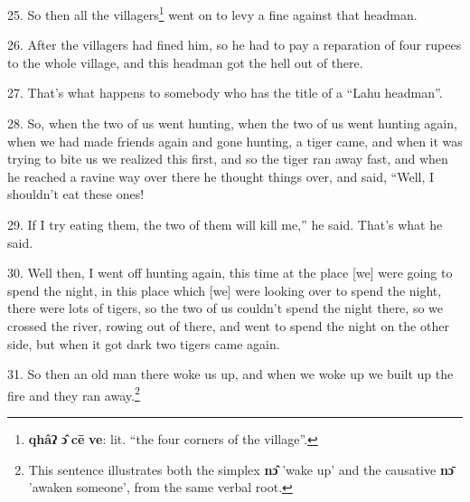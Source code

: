 25. So then all the villagers\footnote{\textbf{qhâʔ} \textbf{ɔ̂} \textbf{cē} \textbf{ve}: lit. ``the four corners of the village''.} went on to levy a fine against that headman.

26. After the villagers had fined him, so he had to pay a reparation of four rupees
to the whole village, and this headman got the hell out of there.

27. That's what happens to somebody who has the title of a ``Lahu headman''.

28. So, when the two of us went hunting, when the two of us went hunting again,
when we had made friends again and gone hunting, a tiger came, and when it was
trying to bite us we realized this first, and so the tiger ran away fast, and when
he reached a ravine way over there he thought things over, and said, ``Well, I
shouldn't eat these ones!

29. If I try eating them, the two of them will kill me,'' he said. That's what he
said.

30. Well then, I went off hunting again, this time at the place [we] were going
to spend the night, in this place which [we] were looking over to spend the night,
there were lots of tigers, so the two of us couldn't spend the night there, so
we crossed the river, rowing out of there, and went to spend the night on the other
side, but when it got dark two tigers came again.

31. So then an old man there woke us up, and when we woke up we built up the fire
and they ran away.\footnote{This sentence illustrates both the simplex \textbf{nɔ̂} 'wake up' and the causative \textbf{nɔ̄} 'awaken someone', from the same verbal root.}


